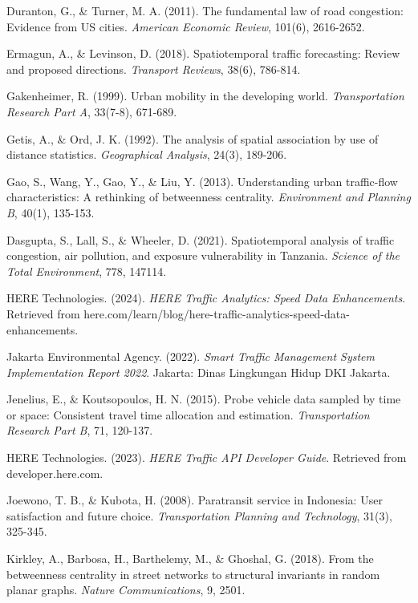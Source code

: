 \documentclass[12pt,a4paper]{article}
\begin{document}
Duranton, G., \& Turner, M. A. (2011). The fundamental law of road congestion: Evidence from US cities. \emph{American Economic Review}, 101(6), 2616-2652.

Ermagun, A., \& Levinson, D. (2018). Spatiotemporal traffic forecasting: Review and proposed directions. \emph{Transport Reviews}, 38(6), 786-814.

Gakenheimer, R. (1999). Urban mobility in the developing world. \emph{Transportation Research Part A}, 33(7-8), 671-689.

Getis, A., \& Ord, J. K. (1992). The analysis of spatial association by use of distance statistics. \emph{Geographical Analysis}, 24(3), 189-206.

Gao, S., Wang, Y., Gao, Y., \& Liu, Y. (2013). Understanding urban traffic-flow characteristics: A rethinking of betweenness centrality. \emph{Environment and Planning B}, 40(1), 135-153.

Dasgupta, S., Lall, S., \& Wheeler, D. (2021). Spatiotemporal analysis of traffic congestion, air pollution, and exposure vulnerability in Tanzania. \emph{Science of the Total Environment}, 778, 147114.

HERE Technologies. (2024). \emph{HERE Traffic Analytics: Speed Data Enhancements}. Retrieved from here.com/learn/blog/here-traffic-analytics-speed-data-enhancements.

Jakarta Environmental Agency. (2022). \emph{Smart Traffic Management System Implementation Report 2022}. Jakarta: Dinas Lingkungan Hidup DKI Jakarta.

Jenelius, E., \& Koutsopoulos, H. N. (2015). Probe vehicle data sampled by time or space: Consistent travel time allocation and estimation. \emph{Transportation Research Part B}, 71, 120-137.


HERE Technologies. (2023). \emph{HERE Traffic API Developer Guide}. Retrieved from developer.here.com.

Joewono, T. B., \& Kubota, H. (2008). Paratransit service in Indonesia: User satisfaction and future choice. \emph{Transportation Planning and Technology}, 31(3), 325-345.

Kirkley, A., Barbosa, H., Barthelemy, M., \& Ghoshal, G. (2018). From the betweenness centrality in street networks to structural invariants in random planar graphs. \emph{Nature Communications}, 9, 2501.
\end{document}
